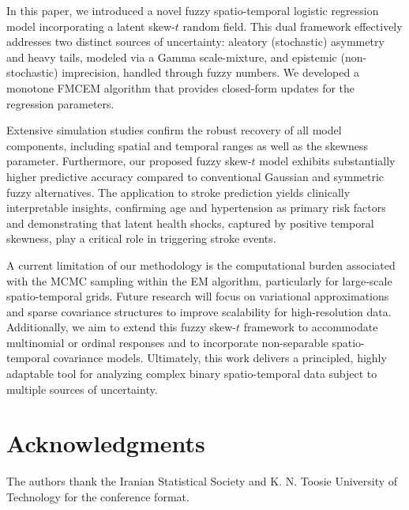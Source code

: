 \documentclass[twoside]{article}
\begin{document}
In this paper, we introduced a novel fuzzy spatio-temporal logistic regression model incorporating a latent skew-\(t\) random field. This dual framework effectively addresses two distinct sources of uncertainty: aleatory (stochastic) asymmetry and heavy tails, modeled via a Gamma scale-mixture, and epistemic (non-stochastic) imprecision, handled through fuzzy numbers. We developed a monotone FMCEM algorithm that provides closed-form updates for the regression parameters. 

Extensive simulation studies confirm the robust recovery of all model components, including spatial and temporal ranges as well as the skewness parameter. Furthermore, our proposed fuzzy skew-\(t\) model exhibits substantially higher predictive accuracy compared to conventional Gaussian and symmetric fuzzy alternatives. The application to stroke prediction yields clinically interpretable insights, confirming age and hypertension as primary risk factors and demonstrating that latent health shocks, captured by positive temporal skewness, play a critical role in triggering stroke events.

A current limitation of our methodology is the computational burden associated with the MCMC sampling within the EM algorithm, particularly for large-scale spatio-temporal grids. Future research will focus on variational approximations and sparse covariance structures to improve scalability for high-resolution data. Additionally, we aim to extend this fuzzy skew-\(t\) framework to accommodate multinomial or ordinal responses and to incorporate non-separable spatio-temporal covariance models. Ultimately, this work delivers a principled, highly adaptable tool for analyzing complex binary spatio-temporal data subject to multiple sources of uncertainty.

\section*{Acknowledgments}   
The authors thank the Iranian Statistical Society and K. N. Toosie University of Technology for the conference format.
\end{document}
